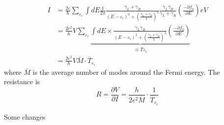 \begin{align}
    I& = \frac{2e}{\hbar}\sum_{\varepsilon_{i}}{\int dE \frac{1}{2\pi}\frac{\gamma_{L}+\gamma_{R}}{\left(E-\varepsilon_{i}\right)^{2}+\left(\frac{\gamma_{L}+\gamma_{R}}{2}\right)^{2}} \frac{\gamma_{L}\gamma_{R}}{\gamma_{L}+\gamma_{R}} \left(\frac{-\partial f_{0}}{\partial E}\right)eV}\nonumber\\
    &= \frac{2e^2}{h}V\sum_{\varepsilon_{i}}{\underbrace{\int dE\times \frac{\gamma_{L}\gamma_{R}}{\left(E-\varepsilon_{i}\right)^{2}+\left(\frac{\gamma_{L}+\gamma_{R}}{2}\right)^{2}} \left(\frac{-\partial f_{0}}{\partial E}\right)}_{\equiv \overline{T}_{}\varepsilon_{i}}}\nonumber\\
    &= \frac{2e^{2}}{h}V\overline{M}\cdot\overline{T}_{\varepsilon_{i}}
\end{align} where $\overline{M}$ is the average number of modes around the Fermi energy. The resistance is \begin{equation}
    R = \frac{\partial V}{\partial I} = \frac{h}{2e^{2}\overline{M}}\cdot\frac{1}{\overline{T}_{\varepsilon_{i}}}
\end{equation} 

Some changes
